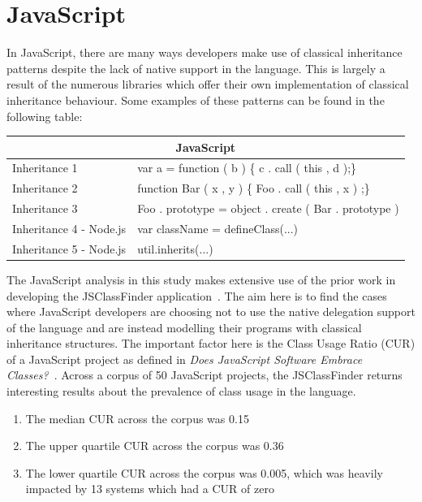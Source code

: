 \section{JavaScript}
In JavaScript, there are many ways developers make use of classical inheritance patterns despite the lack of native support in the language. This is largely a result of the numerous libraries which offer their own implementation of classical inheritance behaviour. Some examples of these patterns can be found in the following table:
\begin{tabular}{|p{5cm}|p{9cm}|}
	\hline
	\multicolumn{2}{|c|}{JavaScript}                                                                                                                                                                  \\ \hline
	Inheritance 1                  & var a = function ( b ) \{    c . call ( this , d );\}                                                                                      \\ \hline
	Inheritance 2                  & function Bar   ( x , y ) \{    Foo . call ( this , x ) ;\}                                                                                 \\ \hline
	Inheritance 3                  & Foo . prototype = object . create ( Bar . prototype )                                                                                      \\ \hline
	Inheritance 4 - Node.js        & var className = defineClass(...)                                                                                                           \\ \hline
	Inheritance 5 - Node.js        & util.inherits(...)                                                                                                                         \\ \hline
\end{tabular}
\newline\newline\newline
The JavaScript analysis in this study makes extensive use of the prior work in developing the JSClassFinder application~\cite{JSClassFinder}. The aim here is to find the cases where JavaScript developers are choosing not to use the native delegation support of the language and are instead modelling their programs with classical inheritance structures. The important factor here is the Class Usage Ratio (CUR) of a JavaScript project as defined in \textit{Does JavaScript Software Embrace Classes?~\cite{JSClassFinder}}. Across a corpus of 50 JavaScript projects, the JSClassFinder returns interesting results about the prevalence of class usage in the language.
\begin{enumerate}
	\item The median CUR across the corpus was 0.15
	\item The upper quartile CUR across the corpus was 0.36
	\item The lower quartile CUR across the corpus was 0.005, which was heavily impacted by 13 systems which had a CUR of zero
\end{enumerate}


